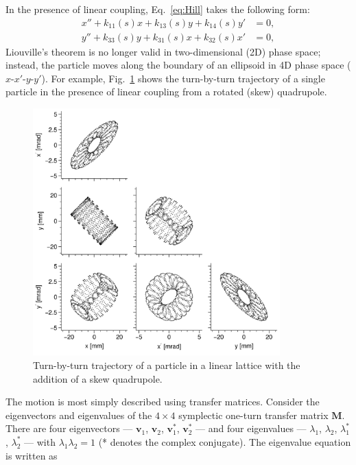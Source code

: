 In the presence of linear coupling, Eq.~\eqref{eq:Hill} takes the following form:
%
\begin{equation}\label{eq:single_particle_eom_coupled}
\begin{aligned}
    x'' + k_{11}(s)x + k_{13}(s)y + k_{14}(s)y' &= 0, \\
    y'' + k_{33}(s)y + k_{31}(s)x + k_{32}(s)x' &= 0,
\end{aligned}
\end{equation}
%
Liouville's theorem is no longer valid in two-dimensional (2D) phase space; instead, the particle moves along the boundary of an ellipsoid in 4D phase space ($x$-$x'$-$y$-$y'$). For example, Fig.~\ref{fig:skew_quad_single_particle_tbt} shows the turn-by-turn trajectory of a single particle in the presence of linear coupling from a rotated (skew) quadrupole.
%
\begin{figure}[!p]
    \centering
    \includegraphics[width=0.85\textwidth]{Images/chapter1/skew_quad_single_particle_tbt.png}
    \caption{Turn-by-turn trajectory of a particle in a linear lattice with the addition of a skew quadrupole.}
    \label{fig:skew_quad_single_particle_tbt}
\end{figure}
%
The motion is most simply described using transfer matrices. Consider the eigenvectors and eigenvalues of the $4 \times 4$ symplectic one-turn transfer matrix $\mathbf{M}$. There are four eigenvectors — $\mathbf{v}_1$, $\mathbf{v}_2$, $\mathbf{v}_1^*$, $\mathbf{v}_2^*$ — and four eigenvalues — $\lambda_1$, $\lambda_2$, $\lambda_1^*$, $\lambda_2^*$ — with $\lambda_1\lambda_2 = 1$ (* denotes the complex conjugate). The eigenvalue equation is written as
